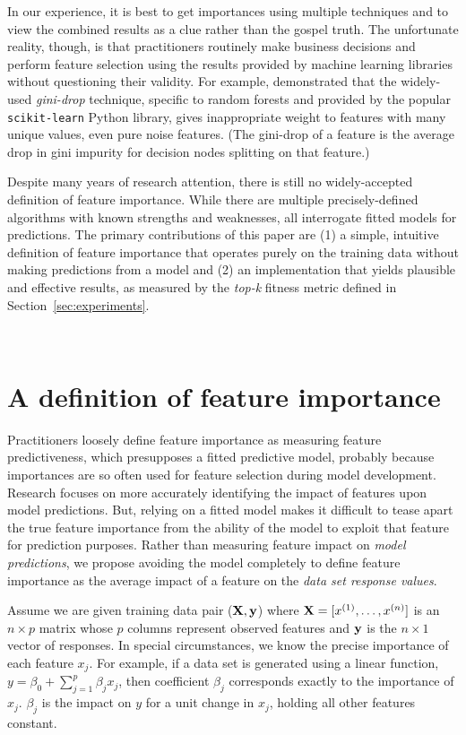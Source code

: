 \documentclass[12pt]{article}
\newcommand{\secref}[1]{Section~\ref{#1}}
\newcommand{\todo}[1]{{{\color{red}{[#1]}}}}
\begin{document}
In our experience, it is best to get importances using multiple techniques and to view the combined results as a clue rather than the gospel truth.  The unfortunate reality, though, is that practitioners routinely make business decisions and  perform feature selection using the results provided by machine learning libraries without questioning their validity.  For example, \cite{rfpimp} demonstrated that the widely-used {\em gini-drop} technique, specific to random forests and provided by the popular {\tt scikit-learn} Python library, gives inappropriate weight to features with many unique values, even pure noise features. (The gini-drop of a feature is the average drop in gini impurity for decision nodes splitting on that feature.) \todo{transition}

Despite many years of research attention, there is still no widely-accepted definition of feature importance. While there are multiple precisely-defined algorithms with known strengths and weaknesses, all interrogate fitted models for predictions. The primary contributions of this paper are (1) a simple, intuitive definition of feature importance that operates purely on the training data without making predictions from a model and (2) an implementation that yields plausible and effective results, as measured by the {\em top-k} fitness metric defined in \secref{sec:experiments}.

~\\
\noindent \todo{Likely a good spot for a paper walk-through}

\section{A definition of feature importance}\label{sec:def}

Practitioners loosely define feature importance as measuring feature predictiveness, which presupposes a fitted predictive model, probably because importances are so often used for feature selection during model development.  Research  focuses on more accurately identifying the impact of features upon model predictions.  But, relying on a fitted model makes it difficult to tease apart the true feature importance from the ability of the model to exploit that feature for prediction purposes. Rather than measuring feature impact on {\em model predictions}, we propose avoiding the model completely to define feature importance as the average impact of a feature on the {\em data set response values}.

Assume we are given training data pair ($\bf X, y$) where ${\bf X} = [x^{(1)}, \ldots, x^{(n)}]$ is an $n \times p$ matrix whose $p$ columns represent observed features and ${\bf y}$ is the $n \times 1$ vector of responses. In special circumstances, we know the precise importance of each feature $x_j$.  For example, if a data set is generated using a linear function, $y = \beta_0 + \sum_{j=1}^p \beta_j x_j$, \todo{assumes independence of $x_j$?} then coefficient $\beta_j$ corresponds exactly to the importance of $x_j$.  $\beta_j$ is the impact on $y$ for a unit change in $x_j$, holding all other features constant.
\end{document}
